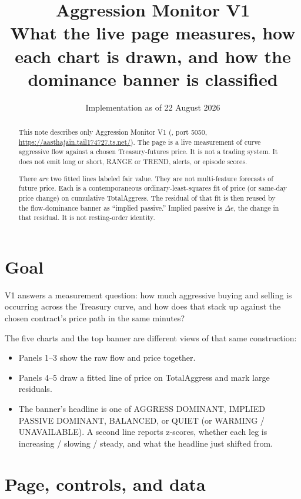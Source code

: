 \documentclass[11pt]{article}
\title{\vspace{-1.5cm}\textbf{Aggression Monitor V1}\\[0.25em]
\large What the live page measures, how each chart is drawn, and how the
dominance banner is classified}
\author{}
\date{Implementation as of 22 August 2026}
\newcommand{\code}[1]{\texttt{\detokenize{#1}}}
\begin{document}
\maketitle
\thispagestyle{fancy}
\vspace{-1.2em}

\begin{abstract}
This note describes only Aggression Monitor V1
(\code{scripts/aggression_dashboard/}, port 5050,
\url{https://aasthajain.tail174727.ts.net/}).
The page is a live measurement of curve aggressive flow against a chosen
Treasury-futures price.  It is not a trading system.  It does not emit
long or short, RANGE or TREND, alerts, or episode scores.

There \emph{are} two fitted lines labeled fair value.  They are not
multi-feature forecasts of future price.  Each is a contemporaneous
ordinary-least-squares fit of price (or same-day price change) on
cumulative TotalAggress.  The residual of that fit is then reused by the
flow-dominance banner as ``implied passive.''  Implied passive is
\(\Delta e\), the change in that residual.  It is not resting-order
identity.
\end{abstract}

\tableofcontents
\newpage

\section{Goal}

V1 answers a measurement question: how much aggressive buying and selling
is occurring across the Treasury curve, and how does that stack up
against the chosen contract's price path in the same minutes?

The five charts and the top banner are different views of that same
construction:

\begin{itemize}
    \item Panels 1--3 show the raw flow and price together.
    \item Panels 4--5 draw a fitted line of price on TotalAggress and mark
    large residuals.
    \item The banner's headline is one of AGGRESS DOMINANT, IMPLIED
    PASSIVE DOMINANT, BALANCED, or QUIET (or WARMING / UNAVAILABLE).
    A second line reports z-scores, whether each leg is increasing /
    slowing / steady, and what the headline just shifted from.
\end{itemize}


\section{Page, controls, and data}
\end{document}
